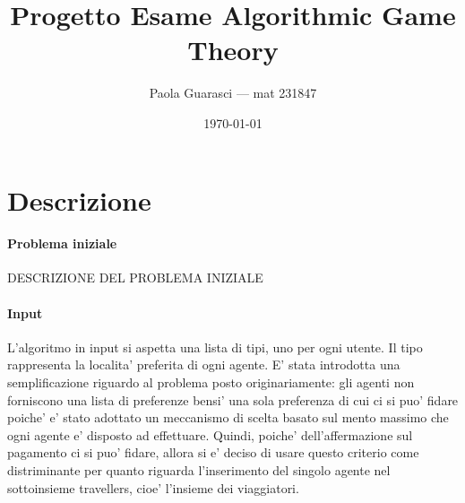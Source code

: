 \documentclass{article}
\title{Progetto Esame Algorithmic Game Theory}
\author{Paola Guarasci --- mat 231847}
\date{\today}
\begin{document}
\maketitle

\section*{Descrizione}
\paragraph*{Problema iniziale}
DESCRIZIONE DEL PROBLEMA INIZIALE 
\paragraph*{Input}
L'algoritmo in input si aspetta una lista di tipi, uno per ogni utente. Il tipo rappresenta la localita' preferita di ogni agente. E' stata introdotta una semplificazione riguardo al problema posto originariamente: gli agenti non forniscono una lista di preferenze bensi' una sola preferenza di cui ci si puo' fidare poiche' e' stato adottato un meccanismo di scelta basato sul mento massimo che ogni agente e' disposto ad effettuare. Quindi, poiche' dell'affermazione sul pagamento ci si puo' fidare, allora si e' deciso di usare questo criterio come distriminante per quanto riguarda l'inserimento del singolo agente nel sottoinsieme travellers, cioe' l'insieme dei viaggiatori. 
\end{document}
